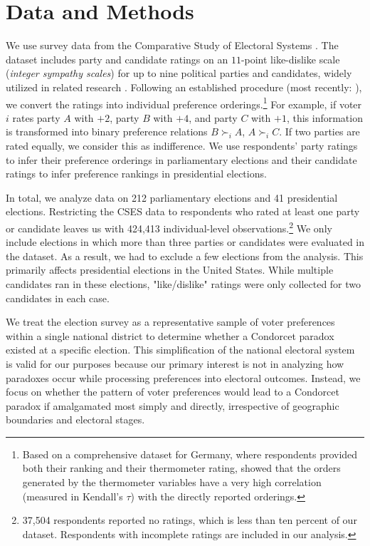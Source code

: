 \documentclass[12pt]{scrartcl}
\newcommand{\nbparliament}{212 }
\newcommand{\nbpresidential}{41 }
\begin{document}
\section{Data and Methods}\label{sec.datamethods}  
We use survey data from the Comparative Study of Electoral Systems \citep{CSES2020}. The dataset includes party and candidate ratings on an $11$-point like-dislike scale (\emph{integer sympathy scales}) for up to nine political parties and candidates, widely utilized in related research \citep[e.g.,][]{Kalandrakis2022, Desai2025}. Following an established procedure (most recently: \cite{Lachat2024}), we convert the ratings into individual preference orderings.\footnote{
    Based on a comprehensive dataset for Germany, where respondents provided both their ranking and their thermometer rating, \cite{Barbaro2022} showed that the orders generated by the thermometer variables have a very high correlation (measured in Kendall's $\tau$) with the directly reported orderings.
} For example, if voter $i$ rates party $A$ with $+2$, party $B$ with $+4$, and party $C$ with $+1$, this information is transformed into binary preference relations $B \succ_i A$, $A \succ_i C$. If two parties are rated equally, we consider this as indifference. We use respondents' party ratings to infer their preference orderings in parliamentary elections and their candidate ratings to infer preference rankings in presidential elections.

In total, we analyze data on \nbparliament parliamentary elections and \nbpresidential presidential elections. Restricting the CSES data to respondents who rated at least one party or candidate leaves us with 424,413 individual-level observations.\footnote{
    37,504 respondents reported no ratings, which is less than ten percent of our dataset. Respondents with incomplete ratings are included in our analysis.
} We only include elections in which more than three parties or candidates were evaluated in the dataset. As a result, we had to exclude a few elections from the analysis. This primarily affects presidential elections in the United States. While multiple candidates ran in these elections, "like/dislike" ratings were only collected for two candidates in each case.

We treat the election survey as a representative sample of voter preferences within a single national district to determine whether a Condorcet paradox existed at a specific election. This simplification of the national electoral system is valid for our purposes because our primary interest is not in analyzing how paradoxes occur while processing preferences into electoral outcomes. Instead, we focus on whether the pattern of voter preferences would lead to a Condorcet paradox if amalgamated most simply and directly, irrespective of geographic boundaries and electoral stages.
\end{document}

